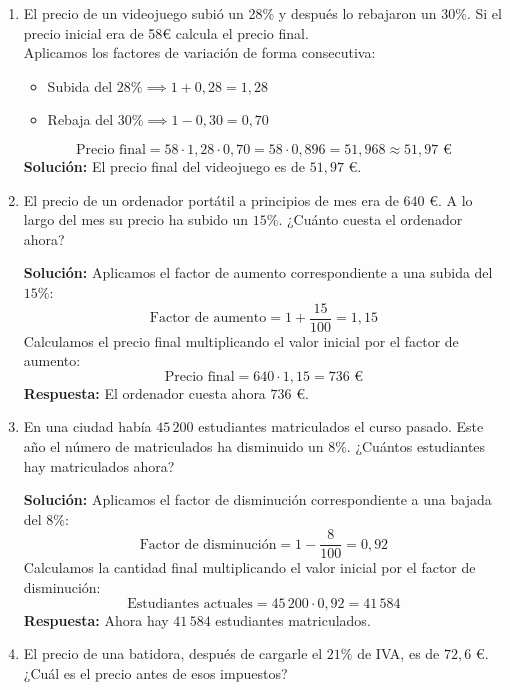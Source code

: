 \documentclass[a4paper,12pt]{article}
\begin{document}
\begin{enumerate}
    \item El precio de un videojuego subió un 28\% y después lo rebajaron un 30\%. Si el precio inicial era de 58€ calcula el precio final. \\
        Aplicamos los factores de variación de forma consecutiva:
        \begin{itemize}
            \item Subida del $28\% \implies 1 + 0{,}28 = 1{,}28$
            \item Rebaja del $30\% \implies 1 - 0{,}30 = 0{,}70$
        \end{itemize}
        \[
        \text{Precio final} = 58 \cdot 1{,}28 \cdot 0{,}70 = 58 \cdot 0{,}896 = 51{,}968 \approx 51{,}97 \text{ €}
        \]
        \textbf{Solución:} El precio final del videojuego es de $51{,}97\text{ €}$.

    \item El precio de un ordenador portátil a principios de mes era de $640\text{ €}$. A lo largo del mes su precio ha subido un $15\%$. ¿Cuánto cuesta el ordenador ahora?
    
        \textbf{Solución:}
        Aplicamos el factor de aumento correspondiente a una subida del $15\%$:
        \[
        \text{Factor de aumento} = 1 + \frac{15}{100} = 1{,}15
        \]
        Calculamos el precio final multiplicando el valor inicial por el factor de aumento:
        \[
        \text{Precio final} = 640 \cdot 1{,}15 = 736\text{ €}
        \]
        \textbf{Respuesta:} El ordenador cuesta ahora $736\text{ €}$.

    \item En una ciudad había $45\,200$ estudiantes matriculados el curso pasado. Este año el número de matriculados ha disminuido un $8\%$. ¿Cuántos estudiantes hay matriculados ahora?
    
        \textbf{Solución:}
        Aplicamos el factor de disminución correspondiente a una bajada del $8\%$:
        \[
        \text{Factor de disminución} = 1 - \frac{8}{100} = 0{,}92
        \]
        Calculamos la cantidad final multiplicando el valor inicial por el factor de disminución:
        \[
        \text{Estudiantes actuales} = 45\,200 \cdot 0{,}92 = 41\,584
        \]
        \textbf{Respuesta:} Ahora hay $41\,584$ estudiantes matriculados.

    \item El precio de una batidora, después de cargarle el $21\%$ de IVA, es de $72{,}6\text{ €}$. ¿Cuál es el precio antes de esos impuestos?
    

\end{enumerate}
\end{document}
